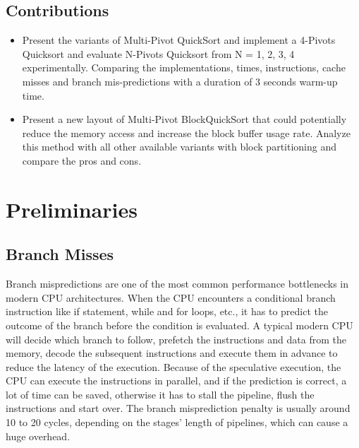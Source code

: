 \documentclass{article}
\begin{document}
\subsection{Contributions}
\begin{itemize}
    \item Present the variants of Multi-Pivot QuickSort and implement a 4-Pivots Quicksort and evaluate N-Pivots Quicksort from N = 1, 2, 3, 4 experimentally. 
        Comparing the implementations, times, instructions, cache misses and branch mis-predictions with a duration of 3 seconds warm-up time.
    \item Present a new layout of Multi-Pivot BlockQuickSort that could potentially reduce the memory access and increase the block buffer usage rate. 
        Analyze this method with all other available variants with block partitioning and compare the pros and cons.
\end{itemize}

\section{Preliminaries}

\subsection{Branch Misses}
Branch mispredictions are one of the most common performance bottlenecks in modern CPU architectures. 
When the CPU encounters a conditional branch instruction like if statement, while and for loops, etc., it has to predict the outcome of the branch before the condition is evaluated.
A typical modern CPU will decide which branch to follow, prefetch the instructions and data from the memory, decode the subsequent instructions and execute them in advance to reduce the latency of the execution.
Because of the speculative execution, the CPU can execute the instructions in parallel, and if the prediction is correct, a lot of time can be saved, otherwise it has to stall the pipeline, flush the instructions and start over.
The branch misprediction penalty is usually around 10 to 20 cycles, depending on the stages' length of pipelines, which can cause a huge overhead.
\end{document}
